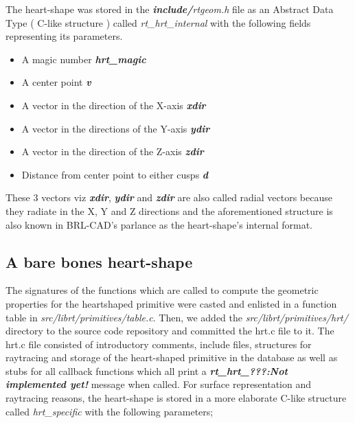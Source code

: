 The   heart-­shape   was   stored   in   the   \textit{\textbf{include/}rtgeom.h}   file   as   an   Abstract   Data  
Type   ( C-­like   structure )   called   \textit{rt\_hrt\_internal}   with   the   following   fields  
representing its parameters.
\begin{itemize}  
\item A magic number \textit{\textbf{hrt\_magic }} 
\item A center point \textit{\textbf{v }} 
\item A vector in the direction of the X-­axis \textit{\textbf{xdir}}  
\item A vector in the directions of the Y­-axis \textit{\textbf{ydir}}  
\item A vector in the direction of the Z­-axis \textit{\textbf{zdir}}  
\item Distance from center point to either cusps \textit{\textbf{d}} 
\end{itemize} 
These   3    vectors viz \textit{\textbf{xdir}}, \textit{\textbf{ydir}} and \textit{\textbf{zdir}}   are   also   called   radial   vectors   because   they   radiate   in   the  X,   Y   and   Z   directions   and   the   aforementioned   structure   is   also   known   in  BRL-­CAD's parlance as the heart-­shape's internal format.

\subsection{A bare bones heart­-shape}

The   signatures   of   the   functions   which   are   called   to   compute   the  
geometric   properties   for   the   heart­shaped   primitive   were   casted   and   enlisted   in  
a   function   table   in   \textit{src/librt/primitives/table.c}.   Then,   we   added   the  
\textit{src/librt/primitives/hrt/}   directory   to   the   source   code   repository   and   committed  
the   hrt.c   file   to   it.   The   hrt.c   file   consisted   of   introductory   comments,   include  
files,   structures   for   raytracing   and   storage   of   the   heart­-shaped   primitive   in   the  
database   as   well   as   stubs   for   all   callback   functions   which   all   print   a  
\textit{\textbf{\“rt\_hrt\_???:Not   implemented   yet!\”}}   message   when   called.   For   surface  
representation   and   raytracing   reasons,   the   heart-­shape   is   stored   in   a   more  
elaborate C-­like structure called \textit{hrt\_specific} with the following parameters;  

